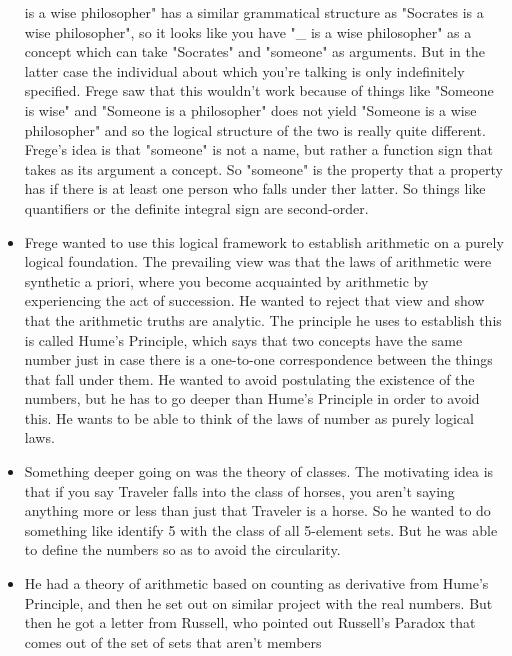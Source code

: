 \documentclass[12pt]{article}
\theoremstyle{definition}
\begin{document}
\begin{itemize}
        is a wise philosopher" has a similar grammatical structure as "Socrates
        is a wise philosopher", so it looks like you have "\_ is a wise
        philosopher" as a concept which can take "Socrates" and "someone" as
        arguments. But in the latter case the individual about which you're
        talking is only indefinitely specified. Frege saw that this wouldn't
        work because of things like "Someone is wise" and "Someone is a
        philosopher" does not yield "Someone is a wise philosopher" and so the
        logical structure of the two is really quite different. Frege's idea is
        that "someone" is not a name, but rather a function sign that takes as
        its argument a concept. So "someone" is the property that a property
        has if there is at least one person who falls under ther latter. So
        things like quantifiers or the definite integral sign are second-order.
    \item
        Frege wanted to use this logical framework to establish arithmetic on a
        purely logical foundation. The prevailing view was that the laws of
        arithmetic were synthetic a priori, where you become acquainted by
        arithmetic by experiencing the act of succession. He wanted to reject
        that view and show that the arithmetic truths are analytic. The
        principle he uses to establish this is called Hume's Principle, which
        says that two concepts have the same number just in case there is a
        one-to-one correspondence between the things that fall under them. He
        wanted to avoid postulating the existence of the numbers, but he has to
        go deeper than Hume's Principle in order to avoid this. He wants to be
        able to think of the laws of number as purely logical laws.
    \item
        Something deeper going on was the theory of classes. The motivating
        idea is that if you say Traveler falls into the class of horses, you
        aren't saying anything more or less than just that Traveler is a
        horse. So he wanted to do something like identify 5 with the class of
        all 5-element sets. But he was able to define the numbers so as to
        avoid the circularity.
    \item
        He had a theory of arithmetic based on counting as derivative from
        Hume's Principle, and then he set out on similar project with the real
        numbers. But then he got a letter from Russell, who pointed out
        Russell's Paradox that comes out of the set of sets that aren't members

\end{itemize}
\end{document}
